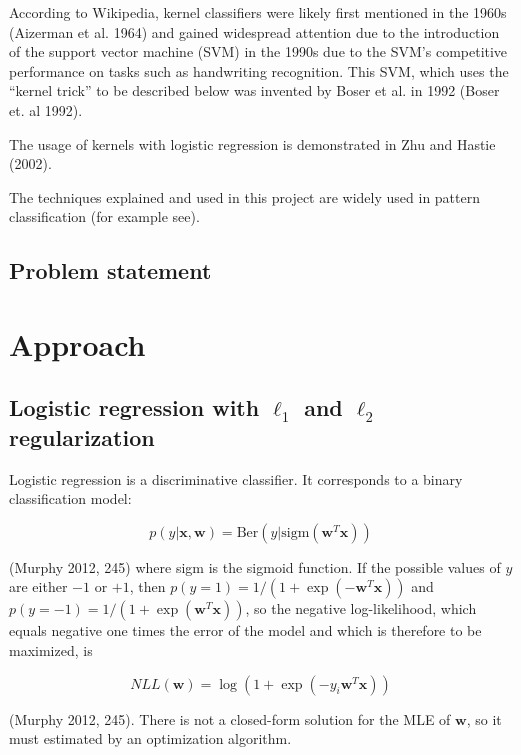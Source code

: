 \documentclass[letterpaper, 11pt]{article}
\newcommand{\vect}[1]{\boldsymbol{#1}}
\begin{document}
According to Wikipedia, kernel classifiers were likely first mentioned in the 1960s (Aizerman et al. 1964) and gained widespread attention due to the introduction of the support vector machine (SVM) in the 1990s due to the SVM's competitive performance on tasks such as handwriting recognition. This SVM, which uses the ``kernel trick'' to be described below was invented by Boser et al. in 1992 (Boser et. al 1992).

The usage of kernels with logistic regression is demonstrated in Zhu and Hastie (2002).

The techniques explained and used in this project are widely used in pattern classification (for example see).

\subsection{Problem statement}

\section{Approach}

\subsection{Logistic regression with $\ell_1$ and $\ell_2$ regularization}

Logistic regression is a discriminative classifier. It corresponds to a binary classification model:

\begin{equation*}
  p(y | \vect{x}, \vect{w}) = \text{Ber}(y | \text{sigm}(\vect{w}^T\vect{x}))
\end{equation*}

(Murphy 2012, 245) where sigm is the sigmoid function. If the possible values of $y$ are either $-1$ or $+1$, then $p(y = 1) = 1 / (1 + \exp(-\vect{w}^T\vect{x}))$ and $p(y = -1) = 1 / (1 + \exp(\vect{w}^T\vect{x}))$, so the negative log-likelihood, which equals negative one times the error of the model and which is therefore to be maximized, is

\begin{equation*}
  NLL(\vect{w}) = \log(1 + \exp(-y_i \vect{w}^T\vect{x}))
\end{equation*}

(Murphy 2012, 245). There is not a closed-form solution for the MLE of $\vect{w}$, so it must estimated by an optimization algorithm.
\end{document}
